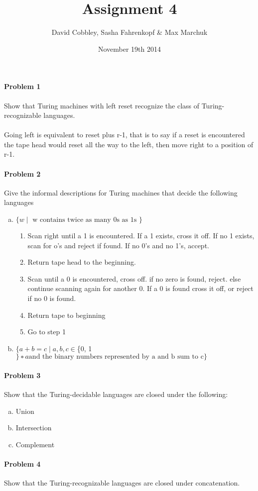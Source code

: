 ﻿\documentclass{article}
\title{Assignment 4}
\author{David Cobbley, Sasha Fahrenkopf \& Max Marchuk}
\date{November 19th 2014}
\begin{document}
\maketitle


\paragraph{Problem 1} Show that Turing machines with left reset recognize
the class of Turing-recognizable languages.
\paragraph{} Going left is equivalent to reset plus r-1, that is to say if a reset is encountered the tape head would reset all the way to the left, then move right to a position of r-1.


\paragraph{Problem 2} Give the informal descriptions for Turing machines that decide the following languages

\begin{enumerate}[a)]

\item $\{w \;|\; \text{ w contains twice as many 0s as 1s } \}$

\begin{enumerate}[1)]
\item Scan right until a 1 is encountered. If a 1 exists, cross it off. If no 1 exists, scan for o's and reject if found. If no 0's and no 1's, accept.
\item Return tape head to the beginning.
\item Scan until a 0 is encountered, cross off. if no zero is found, reject. else continue scanning again for another 0. If a 0 is found cross it off, or reject if no 0 is found.
\item Return tape to beginning
\item Go to step 1
\end{enumerate}

\item  $\{a + b = c \;|\; a, b, c \in $\{0, 1$\} ∗ a\text{and the binary numbers represented by a and b sum to c} \}$


\end{enumerate}


\paragraph{Problem 3} Show that the Turing-decidable languages are closed under the following:
\begin{enumerate}[a)]

\item Union
\item Intersection
\item Complement

\end{enumerate}


\paragraph{Problem 4} Show that the Turing-recognizable languages are closed under concatenation.
\end{document}
